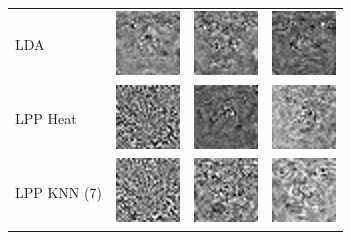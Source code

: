 \documentclass[10pt, a4paper]{article}
\begin{document}
\begin{figure}[h!]
\begin{tabular}{lccc}
LDA & \includegraphics{yale/yale_lda1} & \includegraphics{yale/yale_lda2} & \includegraphics{yale/yale_lda3} \\
LPP Heat & \includegraphics{yale/yale_lpp_heat1} & \includegraphics{yale/yale_lpp_heat2} & \includegraphics{yale/yale_lpp_heat3} \\
LPP KNN (7) & \includegraphics{yale/yale_lpp_knn1} & \includegraphics{yale/yale_lpp_knn2} & \includegraphics{yale/yale_lpp_knn3} \\

\end{tabular}
\end{figure}
\end{document}
